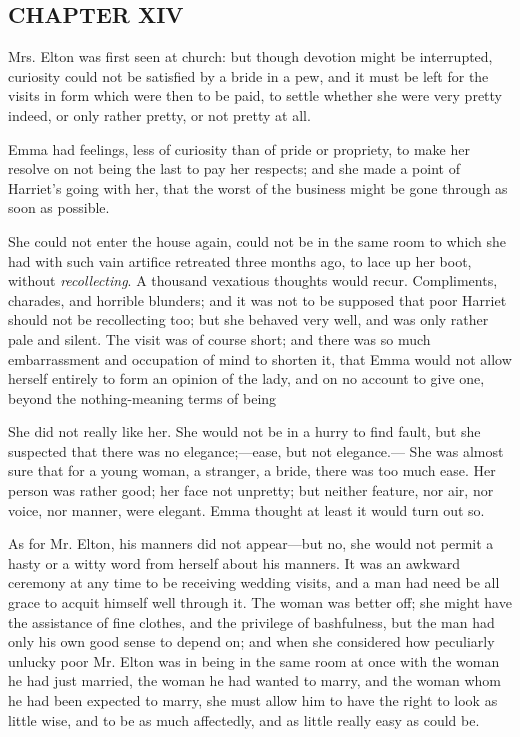 \subsection[chapter-xiv-1]{\useURL[url33][][][]\from[url33]CHAPTER XIV}

Mrs. Elton was first seen at church: but though devotion might be interrupted, curiosity could not be satisfied by a bride in a pew, and it must be left for the visits in form which were then to be paid, to settle whether she were very pretty indeed, or only rather pretty, or not pretty at all.

Emma had feelings, less of curiosity than of pride or propriety, to make her resolve on not being the last to pay her respects; and she made a point of Harriet's going with her, that the worst of the business might be gone through as soon as possible.

She could not enter the house again, could not be in the same room to which she had with such vain artifice retreated three months ago, to lace up her boot, without {\em recollecting}. A thousand vexatious thoughts would recur. Compliments, charades, and horrible blunders; and it was not to be supposed that poor Harriet should not be recollecting too; but she behaved very well, and was only rather pale and silent. The visit was of course short; and there was so much embarrassment and occupation of mind to shorten it, that Emma would not allow herself entirely to form an opinion of the lady, and on no account to give one, beyond the nothing-meaning terms of being 

She did not really like her. She would not be in a hurry to find fault, but she suspected that there was no elegance;---ease, but not elegance.--- She was almost sure that for a young woman, a stranger, a bride, there was too much ease. Her person was rather good; her face not unpretty; but neither feature, nor air, nor voice, nor manner, were elegant. Emma thought at least it would turn out so.

As for Mr. Elton, his manners did not appear---but no, she would not permit a hasty or a witty word from herself about his manners. It was an awkward ceremony at any time to be receiving wedding visits, and a man had need be all grace to acquit himself well through it. The woman was better off; she might have the assistance of fine clothes, and the privilege of bashfulness, but the man had only his own good sense to depend on; and when she considered how peculiarly unlucky poor Mr. Elton was in being in the same room at once with the woman he had just married, the woman he had wanted to marry, and the woman whom he had been expected to marry, she must allow him to have the right to look as little wise, and to be as much affectedly, and as little really easy as could be.

